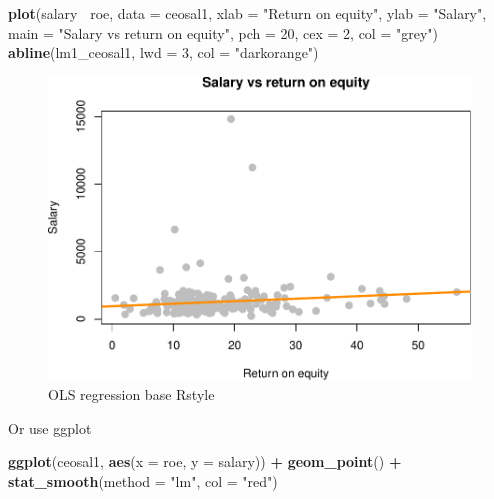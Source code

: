 \documentclass[]{book}
\newenvironment{Shaded}{\begin{snugshade}}{\end{snugshade}}
\newcommand{\DataTypeTok}[1]{\textcolor[rgb]{0.13,0.29,0.53}{#1}}
\newcommand{\DecValTok}[1]{\textcolor[rgb]{0.00,0.00,0.81}{#1}}
\newcommand{\KeywordTok}[1]{\textcolor[rgb]{0.13,0.29,0.53}{\textbf{#1}}}
\newcommand{\NormalTok}[1]{#1}
\newcommand{\OperatorTok}[1]{\textcolor[rgb]{0.81,0.36,0.00}{\textbf{#1}}}
\newcommand{\StringTok}[1]{\textcolor[rgb]{0.31,0.60,0.02}{#1}}
\begin{document}
\begin{Shaded}
\begin{Highlighting}[]
\KeywordTok{plot}\NormalTok{(salary}\OperatorTok{~}\StringTok{ }\NormalTok{roe, }\DataTypeTok{data =}\NormalTok{ ceosal1,}
     \DataTypeTok{xlab =} \StringTok{"Return on equity"}\NormalTok{,}
     \DataTypeTok{ylab =} \StringTok{"Salary"}\NormalTok{,}
     \DataTypeTok{main =} \StringTok{"Salary vs return on equity"}\NormalTok{,}
     \DataTypeTok{pch  =} \DecValTok{20}\NormalTok{,}
     \DataTypeTok{cex  =} \DecValTok{2}\NormalTok{,}
     \DataTypeTok{col  =} \StringTok{"grey"}\NormalTok{)}
\KeywordTok{abline}\NormalTok{(lm1_ceosal1, }\DataTypeTok{lwd =} \DecValTok{3}\NormalTok{, }\DataTypeTok{col =} \StringTok{"darkorange"}\NormalTok{)}
\end{Highlighting}
\end{Shaded}

\begin{figure}

{\centering \includegraphics[width=0.8\linewidth]{MEM5220_R_files/figure-latex/fig1-1} 

}

\caption{OLS regression base Rstyle}\label{fig:fig1}
\end{figure}

Or use ggplot

\begin{Shaded}
\begin{Highlighting}[]
\KeywordTok{ggplot}\NormalTok{(ceosal1, }\KeywordTok{aes}\NormalTok{(}\DataTypeTok{x =}\NormalTok{ roe, }\DataTypeTok{y =}\NormalTok{ salary)) }\OperatorTok{+}\StringTok{ }
\StringTok{  }\KeywordTok{geom_point}\NormalTok{() }\OperatorTok{+}
\StringTok{  }\KeywordTok{stat_smooth}\NormalTok{(}\DataTypeTok{method =} \StringTok{"lm"}\NormalTok{, }\DataTypeTok{col =} \StringTok{"red"}\NormalTok{)}
\end{Highlighting}
\end{Shaded}
\end{document}
